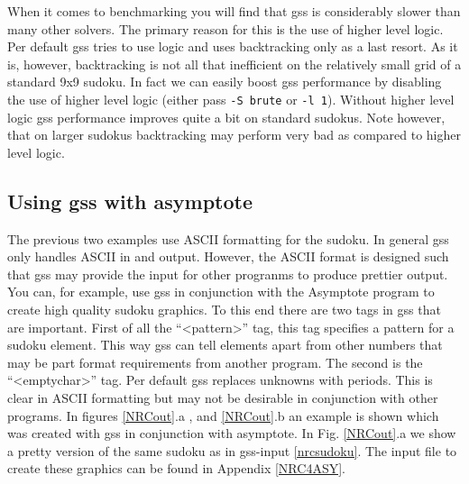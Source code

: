 \documentclass[12pt]{article}
\begin{document}
When it comes to benchmarking you will find that gss is considerably slower than many other solvers. The primary reason for this is the use of higher level logic.
Per default gss tries to use logic and uses backtracking only as a last resort. As it is, however, backtracking is not all that inefficient on the relatively small grid of a standard 9x9 sudoku. In fact we can easily boost gss performance by disabling the use of higher level logic (either pass  \texttt{-S brute} or \texttt{-l 1}). Without higher level logic gss performance improves quite a bit on standard sudokus. Note however, that on larger sudokus backtracking may perform very bad as compared to higher level logic.

\subsection{Using gss with asymptote}
The previous two examples use ASCII formatting for the sudoku. In general gss only handles ASCII in and output. However, the ASCII format is designed such that gss may provide the input for other progranms to produce prettier output. You can, for example, use gss in conjunction with the Asymptote program to create high quality sudoku graphics. To this end there are two tags in gss that are important. First of all the  ``\textless pattern\textgreater '' tag, this tag specifies a pattern for a sudoku element. This way gss can tell elements apart from other numbers that may be part format requirements from another program. The second is the ``\textless emptychar\textgreater '' tag. Per default gss replaces unknowns with periods. This is clear in ASCII formatting but may not be desirable in conjunction with other programs. In figures \ref{NRCout}.a , and \ref{NRCout}.b an example is shown which was created with gss in conjunction with asymptote. In Fig. \ref{NRCout}.a we show a pretty version of the same sudoku as in gss-input \ref{nrcsudoku}. The input file to create these graphics can be found in Appendix \ref{NRC4ASY}.
\end{document}
